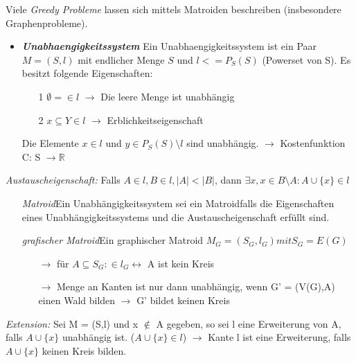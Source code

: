 Viele \textit{Greedy Probleme} lassen sich mittels Matroiden beschreiben (insbesondere Graphenprobleme).\newline

\begin{itemize}
	\item \textbf{\textit{Unabhaengigkeitssystem}} \newline Ein Unabhaengigkeitssystem ist ein Paar $M = (S,l)$ mit endlicher Menge $S$ und $l <= P_S(S)$ (Powerset von S). Es besitzt folgende Eigenschaften:
	\begin{itemize}
		\item[1] $\emptyset = {} \in l$ $\rightarrow$ Die leere Menge ist unabhängig
		\item[2] $x \subseteq Y \in l$ $\rightarrow$ Erblichkeitseigenschaft
	\end{itemize}
	Die Elemente $x \in l$ und $y \in P_S(S) \setminus l$ sind unabhängig. \newline
	$\rightarrow$ Kostenfunktion C: S $\rightarrow \mathbb{R}$ 
\end{itemize}
\textit{Austauscheigenschaft:} \newline Falls $A \in l, B \in l, |A| < |B|$, dann $\exists x, x \in B \setminus A: A \cup \{x\} \in l$
\begin{itemize}
	\item[] \textit{Matroid}\newline Ein Unabhängigkeitssystem sei ein Matroidfalls die Eigenschaften eines Unabhängigkeitssystems und die Austauscheigenschaft erfüllt sind.
	\item[] \textit{grafischer Matroid}\newline Ein graphischer Matroid $M_G = (S_G,l_G) mit S_G = E(G)$
	\begin{itemize}
		\item[$\rightarrow$] für $A \subseteq S_G: \in l_G \leftrightarrow$ A ist kein Kreis
		\item[$\rightarrow$] Menge an Kanten ist nur dann unabhängig, wenn G' = (V(G),A) einen Wald bilden $\rightarrow$ G' bildet keinen Kreis
	\end{itemize}
\end{itemize}

\textit{Extension:} \newline Sei M = (S,l) und x $\notin$ A gegeben, so sei l eine Erweiterung von A, falls $A \cup \{x\}$ unabhängig ist. ($A \cup \{x\}\in l$) \newline  $\rightarrow$ Kante l ist eine Erweiterung, falls $A \cup \{x\}$ keinen Kreis bilden. \newline 


